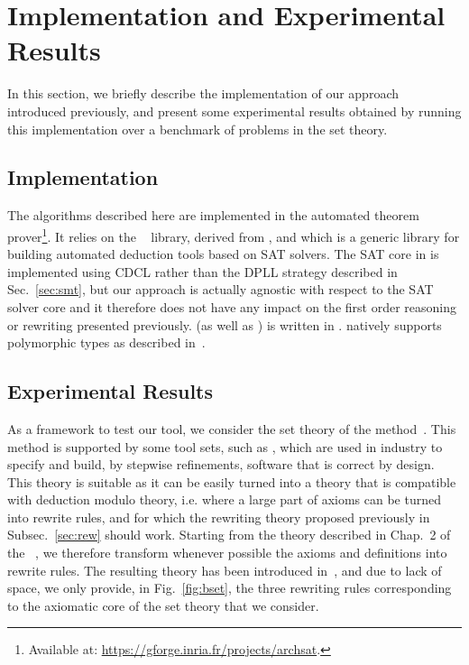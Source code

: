 
\section{Implementation and Experimental Results}
\label{sec:bench}

In this section, we briefly describe the implementation of our approach
introduced previously, and present some experimental results obtained by running
this implementation over a benchmark of problems in the \bmth{} set theory.

\subsection{Implementation}

The algorithms described here are implemented in the \archsat{} automated
theorem prover\footnote{Available at:
\url{https://gforge.inria.fr/projects/archsat}.}. It relies on the
\msat{}~\cite{GB17} library, derived from \altergoz{}, and which is a generic
library for building automated deduction tools based on SAT solvers. The SAT
core in \msat{} is implemented using CDCL rather than the DPLL strategy
described in Sec.~\ref{sec:smt}, but our approach is actually agnostic with
respect to the SAT solver core and it therefore does not have any impact on the
first order reasoning or rewriting presented previously. \archsat{} (as well as
\msat{}) is written in \ocaml{}. \archsat{} natively supports polymorphic types
as described in~\cite{BP13}.

\subsection{Experimental Results}

As a framework to test our tool, we consider the set theory of the \bmth{}
method~\cite{B-Book}. This method is supported by some tool sets, such as
\atelierb{}, which are used in industry to specify and build, by stepwise
refinements, software that is correct by design. This theory is suitable as it
can be easily turned into a theory that is compatible with deduction modulo
theory, i.e. where a large part of axioms can be turned into rewrite rules, and
for which the rewriting theory proposed previously in Subsec.~\ref{sec:rew}
should work. Starting from the theory described in Chap.~2 of the
\bbook{}~\cite{B-Book}, we therefore transform whenever possible the axioms and
definitions into rewrite rules. The resulting theory has been introduced
in~\cite{BA15}, and due to lack of space, we only provide, in
Fig.~\ref{fig:bset}, the three rewriting rules corresponding to the axiomatic
core of the \bmth{} set theory that we consider.

